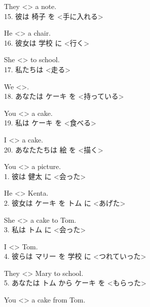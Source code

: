 \documentclass[uplatex,
paper=a4,
fontsize=18pt,
jafontsize=16pt,
number_of_lines=30,
line_length=30zh,
baselineskip=25pt,
]{jlreq}
\begin{document}
  They <\hspace{3em}> a note.
\\

15.  彼は 椅子 を <手に入れる>

  He <\hspace{3em}> a chair.
\\

16.  彼女は 学校 に <行く>

  She <\hspace{3em}> to school.
\\

17.  私たちは <走る>

  We <\hspace{3em}>.
\\

18.  あなたは ケーキ を <持っている>

  You <\hspace{3em}> a cake.
\\

19.  私は ケーキ を <食べる>

  I <\hspace{3em}> a cake.
\\

20.  あなたたちは 絵 を <描く>

  You <\hspace{3em}> a picture.
\\


\newpage
{}
1.  彼は 健太 に <会った>

  He <\hspace{3em}> Kenta.
\\

2.  彼女は ケーキ を トム に <あげた>

  She <\hspace{3em}> a cake to Tom.
\\

3.  私は トム に <会った>

  I <\hspace{3em}> Tom.
\\

4.  彼らは マリー を 学校 に <つれていった>

  They <\hspace{3em}> Mary to school.
\\

5.  あなたは トム から ケーキ を <もらった>

  You <\hspace{3em}> a cake from Tom.
\\
\end{document}
